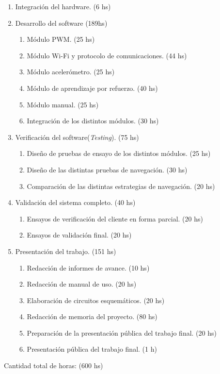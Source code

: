 \documentclass[
11pt, %
codirector, %
]{charter}
\begin{document}
\begin{enumerate}

\item Integración del hardware. (6 hs)	
\item Desarrollo del software (189hs)
	\begin{enumerate}
	\item Módulo PWM. (25 hs)
	\item Módulo Wi-Fi y protocolo de comunicaciones. (44 hs)
	\item Módulo acelerómetro.  (25 hs)
	\item Módulo de aprendizaje por refuerzo. (40 hs)
	\item Módulo manual. (25 hs)
	\item Integración de los distintos módulos. (30 hs)
	\end{enumerate}	
\item Verificación del software(\textit{Testing}). (75 hs)
	\begin{enumerate}
	\item Diseño de pruebas  de ensayo de los distintos módulos. (25 hs)
	\item Diseño de las distintas pruebas de navegación. (30 hs)
	\item Comparación de las distintas estrategias de navegación. (20 hs)
	\end{enumerate}	
\item Validación del sistema completo. (40 hs)
	\begin{enumerate}
	\item Ensayos de verificación del cliente en forma parcial. (20 hs)
	\item Ensayos de validación final. (20 hs)
	\end{enumerate}	
\item Presentación del trabajo. (151 hs)
	\begin{enumerate}
	\item Redacción de informes de avance. (10 hs)
	\item Redacción de manual de uso. (20 hs)
	\item Elaboración de circuitos esquemáticos. (20 hs)
	\item Redacción de memoria del proyecto. (80 hs)
	\item Preparación de la presentación pública del trabajo final. (20 hs)
	\item Presentación pública del trabajo final. (1 h)
	\end{enumerate}					
\end{enumerate}
Cantidad total de horas: (600 hs)
\end{document}
